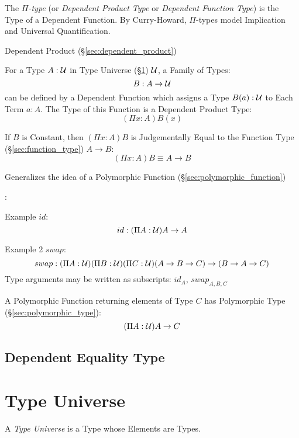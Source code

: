 The \emph{$\Pi$-type} (or \emph{Dependent Product Type} or
\emph{Dependent Function Type}) is the Type of a Dependent Function.
By Curry-Howard, $\Pi$-types model Implication and Universal
Quantification.

Dependent Product (\S\ref{sec:dependent_product})

For a Type $A : \mathcal{U}$ in Type Universe
(\S\ref{sec:type_universe}) $\mathcal{U}$, a Family of Types:
\[
  B : A \rightarrow \mathcal{U}
\]
can be defined by a Dependent Function which assigns a Type $B(a) :
\mathcal{U}$ to Each Term $a : A$. The Type of this Function is a
Dependent Product Type:
\[
  (\Pi x:A)B(x)
\]

If $B$ is Constant, then $(\Pi x:A)B$ is Judgementally Equal to the
Function Type (\S\ref{sec:function_type}) $A \rightarrow B$:
\[
  (\Pi x:A)B \equiv A \rightarrow B
\]

Generalizes the idea of a Polymorphic Function
(\S\ref{sec:polymorphic_function})

\cite{hott13}:

Example $id$:
\[
  id : (\Pi A:\mathcal{U}) A \rightarrow A
\]

Example 2 $swap$:
\[
  swap : (\Pi A:\mathcal{U}) (\Pi B:\mathcal{U}) (\Pi C:\mathcal{U})
  (A \rightarrow B \rightarrow C) \rightarrow (B \rightarrow A
  \rightarrow C)
\]
Type arguments may be written as subscripts: $id_A$, $swap_{A,B,C}$

A Polymorphic Function returning elements of Type $C$ has Polymorphic
Type (\S\ref{sec:polymorphic_type}):
\[
  (\Pi A:\mathcal{U}) A \rightarrow C
\]



\subsection{Dependent Equality Type}\label{sec:dependent_equality}



\section{Type Universe}\label{sec:type_universe}

A \emph{Type Universe} is a Type whose Elements are Types.


